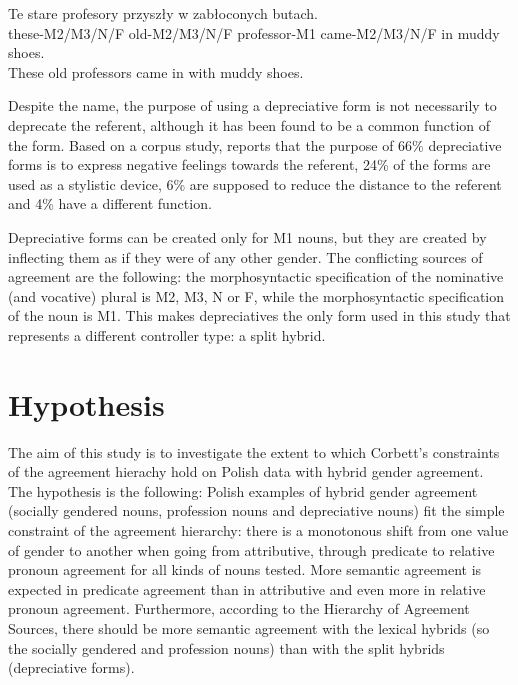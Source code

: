 \begin{exe}
  \ex\label{ex:profesory}
  \gll Te stare profesory przyszły w zabłoconych butach.\\
  these-M2/M3/N/F old-M2/M3/N/F professor-M1 came-M2/M3/N/F in muddy shoes.\\
  \trans These old professors came in with muddy shoes.
\end{exe}

Despite the name, the purpose of using a depreciative form is not necessarily to deprecate the referent, although it has been found to be a common function of the form. Based on a corpus study, \cite{siuda_funkcje_2010} reports that the purpose of 66\% depreciative forms is to express negative feelings towards the referent, 24\% of the forms are used as a stylistic device, 6\% are supposed to reduce the distance to the referent and 4\% have a different function.

Depreciative forms can be created only for M1 nouns, but they are created by inflecting them as if they were of any other gender. The conflicting sources of agreement are the following: the morphosyntactic specification of the nominative (and vocative) plural is M2, M3, N or F, while the morphosyntactic specification of the noun is M1. This makes depreciatives the only form used in this study that represents a different controller type: a split hybrid.

\section{Hypothesis}
The aim of this study is to investigate the extent to which Corbett's constraints of the agreement hierachy hold on Polish data with hybrid gender agreement. The hypothesis is the following: Polish examples of hybrid gender agreement (socially gendered nouns, profession nouns and depreciative nouns) fit the simple constraint of the agreement hierarchy: there is a monotonous shift from one value of gender to another when going from attributive, through predicate to relative pronoun agreement for all kinds of nouns tested. More semantic agreement is expected in predicate agreement than in attributive and even more in relative pronoun agreement. Furthermore, according to the Hierarchy of Agreement Sources, there should be more semantic agreement with the lexical hybrids (so the socially gendered and profession nouns) than with the split hybrids (depreciative forms).
